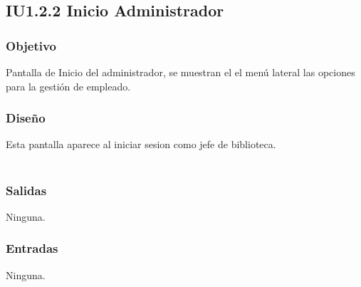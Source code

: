 \newpage
\subsection{IU1.2.2 Inicio Administrador}

\subsubsection{Objetivo}
	Pantalla de Inicio del administrador, se muestran el el menú lateral las opciones para la gestión de empleado.
\subsubsection{Diseño}
	Esta pantalla aparece al iniciar sesion como jefe de biblioteca.  \\\\



\subsubsection{Salidas}
	\begin{Citemize}
		\item Ninguna. 
	\end{Citemize}
	
\subsubsection{Entradas}
	\begin{Citemize}
		\item Ninguna. 
	\end{Citemize}
